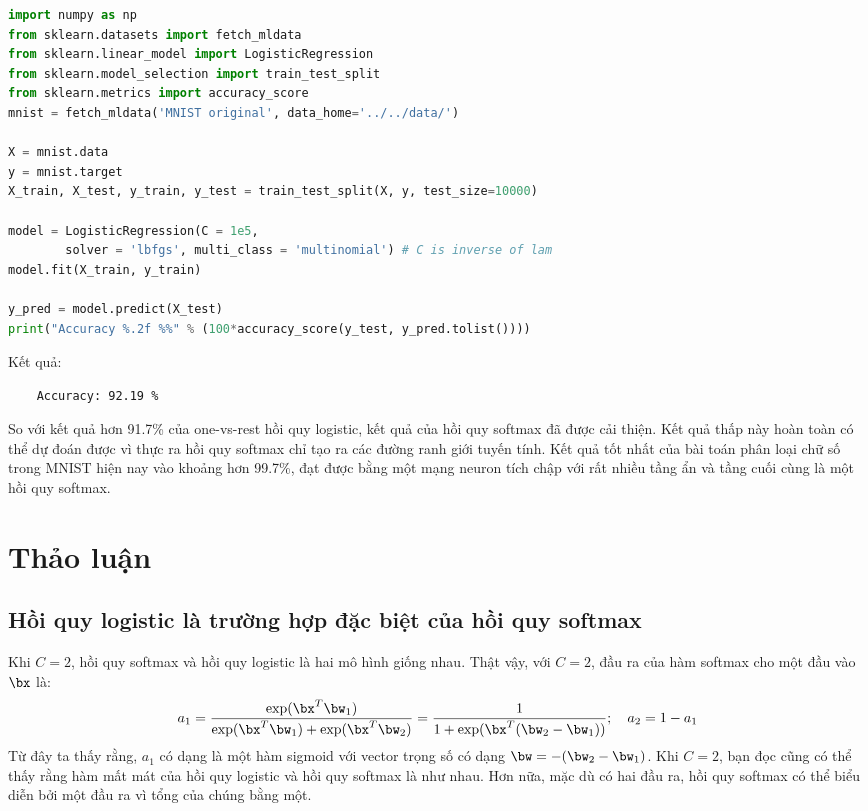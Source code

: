 \begin{lstlisting}[language=Python]
import numpy as np 
from sklearn.datasets import fetch_mldata
from sklearn.linear_model import LogisticRegression 
from sklearn.model_selection import train_test_split
from sklearn.metrics import accuracy_score
mnist = fetch_mldata('MNIST original', data_home='../../data/')

X = mnist.data 
y = mnist.target
X_train, X_test, y_train, y_test = train_test_split(X, y, test_size=10000)

model = LogisticRegression(C = 1e5,
        solver = 'lbfgs', multi_class = 'multinomial') # C is inverse of lam 
model.fit(X_train, y_train)

y_pred = model.predict(X_test)
print("Accuracy %.2f %%" % (100*accuracy_score(y_test, y_pred.tolist())))
\end{lstlisting}
Kết quả:
\begin{lstlisting}
    Accuracy: 92.19 % 
\end{lstlisting}
 
So với kết quả hơn 91.7\% của one-vs-rest hồi quy logistic, kết quả
của hồi quy softmax đã được cải thiện. Kết quả thấp này hoàn toàn có thể dự đoán được vì thực ra hồi quy softmax chỉ tạo ra các đường
ranh giới tuyến tính. Kết quả tốt nhất của bài toán phân loại chữ
số trong MNIST hiện nay vào khoảng hơn 99.7\%, đạt được bằng một mạng neuron tích chập với rất nhiều tầng ẩn và tầng cuối cùng là một
hồi quy softmax. 
 
 
\section{Thảo luận }
 
\subsection{Hồi quy logistic là trường hợp đặc biệt của hồi quy softmax}
 
Khi $C = 2$, hồi quy softmax và hồi quy logistic là hai mô hình giống nhau. Thật vậy,
với $C = 2$, đầu ra của hàm softmax cho một đầu vào $\bx$ là:
\begin{equation}
    a_1 = \frac{\exp(\bx^T\bw_1)} {\exp(\bx^T\bw_1) +
\exp(\bx^T\bw_2)} 
= \frac{1}{1 + \exp(\bx^T(\bw_2 - \bw_1))};\quad a_2 = 1 -
a_1
\end{equation}
Từ đây ta thấy rằng, $a_1$ có dạng là một hàm sigmoid với vector trọng số có dạng $\bw =
-(\bw_2 - \bw_1)$.
Khi $C = 2$, bạn đọc cũng có thể thấy rằng hàm mất mát của hồi quy logistic
và hồi quy softmax là như nhau. Hơn nữa, mặc dù có hai đầu ra, hồi quy softmax có thể biểu diễn bởi một đầu ra vì tổng của chúng bằng một.

